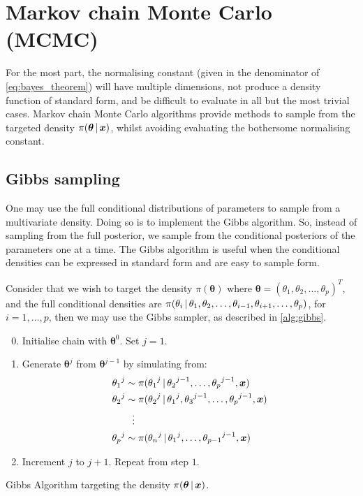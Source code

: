 \section{Markov chain Monte Carlo (MCMC)}
\label{sec:mcmc}

For the most part, the normalising constant (given in the denominator of
\cref{eq:bayes_theorem}) will have multiple dimensions, not produce a density function of
standard form, and be difficult to evaluate in all but the most trivial cases. Markov
chain Monte Carlo algorithms provide methods to sample from the targeted density
$\pi(\bm{\theta} \,|\, \bm{x})$, whilst avoiding evaluating the bothersome normalising
constant.

\subsection{Gibbs sampling}
\label{ssec:gibbs_sampling}

One may use the full conditional distributions of parameters to sample from a multivariate
density.  Doing so is to implement the Gibbs algorithm. So, instead of sampling from the
full posterior, we sample from the conditional posteriors of the parameters one at a time.
The Gibbs algorithm is useful when the conditional densities can be expressed in standard
form and are easy to sample form.

Consider that we wish to target the density $\pi(\bm{\theta})$ where $\bm{\theta} =
(\theta_1, \theta_2, \dots, \theta_p)^T$, and the full conditional densities are
$\pi(\theta_i \,|\, \theta_1, \theta_2, \dots, \theta_{i-1}, \theta_{i+1}, \dots,
\theta_p)$, for $i=1,\dots,p$, then we may use the Gibbs sampler, as described in
\cref{alg:gibbs}.

\begin{algorithm}[tb]
    \begin{algorithmic}
	\begin{enumerate}
	    \setcounter{enumi}{-1}
	    \item Initialise chain with $\bm{\theta}^{0}$. Set $j=1$.
	    \item Generate $\bm{\theta}^{j}$ from $\bm{\theta}^{j-1}$ by simulating from:
	    \begin{align*}
	            {\theta_1}^{j} &\sim \pi({\theta_1}^{j} \,|\, 
{\theta_2}^{j-1},\dots,{\theta_p}^{j-1},\bm{x})\\
	            {\theta_2}^{j} &\sim \pi({\theta_2}^{j} \,|\, {\theta_1}^{j}, {\theta_3}^{j-1}, \dots, 
{\theta_p}^{j-1},\bm{x})\\
	            &\hspace{0.25cm}\vdots \\
	            {\theta_p}^{j} &\sim \pi({\theta_n}^{j} \,|\, {\theta_1}^{j}, \dots, 
{\theta_{p-1}}^{j-1},\bm{x})
	    \end{align*}
	    \item Increment $j$ to $j+1$. Repeat from step $1$.
	\end{enumerate}
	\caption{Gibbs Algorithm targeting the density $\pi(\bm{\theta} \,|\, \bm{x})$.}
	\label{alg:gibbs}
    \end{algorithmic}
\end{algorithm}

